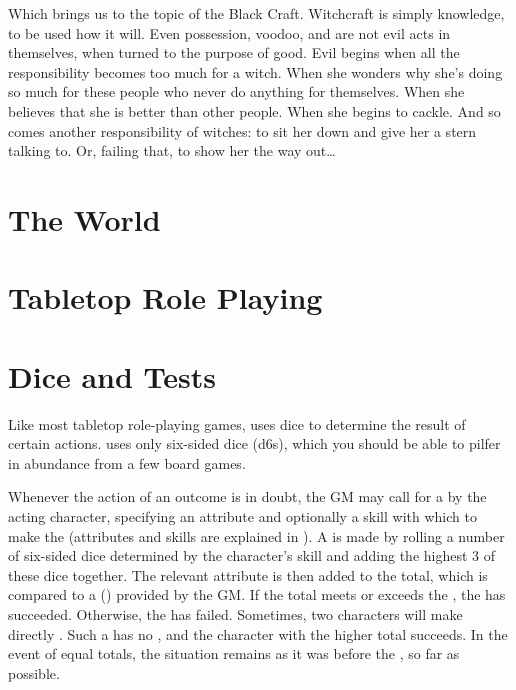 Which brings us to the topic of the Black Craft.
Witchcraft is simply knowledge, to be used how it will.
Even possession, voodoo, and  are not evil acts in themselves, when turned to the purpose of good. %
Evil begins when all the responsibility becomes too much for a witch.
When she wonders why she's doing so much for these people who never do anything for themselves.
When she believes that she is better than other people.
When she begins to cackle.
And so comes another responsibility of witches: to sit her down and give her a stern talking to.
Or, failing that, to show her the way out{\dots}

\section{The World}


\section{Tabletop Role Playing}

\section{Dice and Tests}

Like most tabletop role-playing games,  uses dice to determine the result of certain actions.
 uses only six-sided dice (d6s), which you should be able to pilfer in abundance from a few board games.

Whenever the action of an outcome is in doubt, the GM may call for a {\test} by the acting character, specifying an attribute and optionally a skill with which to make the {\test} (attributes and skills are explained in ).
A {\test} is made by rolling a number of six-sided dice determined by the character's skill and adding the highest 3 of these dice together.
The relevant attribute is then added to the total, which is compared to a {\targetnumber} ({\tn}) provided by the GM.
If the total meets or exceeds the {\tn}, the {\test} has succeeded.
Otherwise, the {\test} has failed.
Sometimes, two characters will make directly {\opposed} {\tests}.
Such a {\test} has no {\tn}, and the character with the higher total succeeds.
In the event of equal totals, the situation remains as it was before the {\test}, so far as possible.

